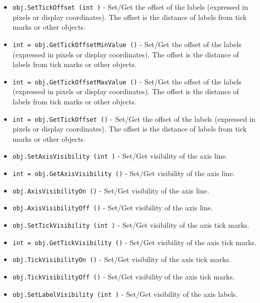 \begin{itemize}
\item  \verb|obj.SetTickOffset (int )| -  Set/Get the offset of the labels (expressed in pixels or display
 coordinates). The offset is the distance of labels from tick marks
 or other objects.

\item  \verb|int = obj.GetTickOffsetMinValue ()| -  Set/Get the offset of the labels (expressed in pixels or display
 coordinates). The offset is the distance of labels from tick marks
 or other objects.

\item  \verb|int = obj.GetTickOffsetMaxValue ()| -  Set/Get the offset of the labels (expressed in pixels or display
 coordinates). The offset is the distance of labels from tick marks
 or other objects.

\item  \verb|int = obj.GetTickOffset ()| -  Set/Get the offset of the labels (expressed in pixels or display
 coordinates). The offset is the distance of labels from tick marks
 or other objects.

\item  \verb|obj.SetAxisVisibility (int )| -  Set/Get visibility of the axis line.

\item  \verb|int = obj.GetAxisVisibility ()| -  Set/Get visibility of the axis line.

\item  \verb|obj.AxisVisibilityOn ()| -  Set/Get visibility of the axis line.

\item  \verb|obj.AxisVisibilityOff ()| -  Set/Get visibility of the axis line.

\item  \verb|obj.SetTickVisibility (int )| -  Set/Get visibility of the axis tick marks.

\item  \verb|int = obj.GetTickVisibility ()| -  Set/Get visibility of the axis tick marks.

\item  \verb|obj.TickVisibilityOn ()| -  Set/Get visibility of the axis tick marks.

\item  \verb|obj.TickVisibilityOff ()| -  Set/Get visibility of the axis tick marks.

\item  \verb|obj.SetLabelVisibility (int )| -  Set/Get visibility of the axis labels.


\end{itemize}
